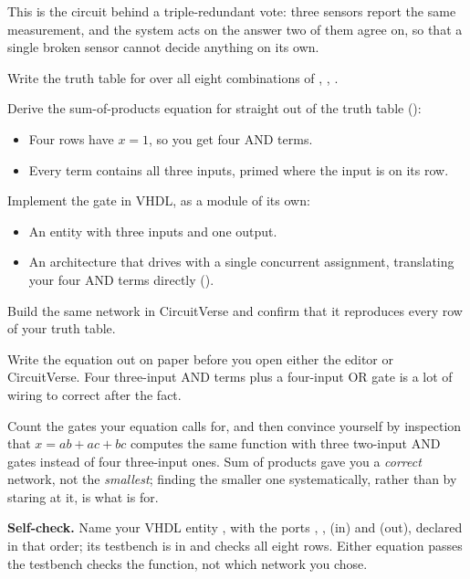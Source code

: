 This is the circuit behind a triple-redundant vote: three sensors report the same measurement, and
the system acts on the answer two of them agree on, so that a single broken sensor cannot decide
anything on its own.

 Write the truth table for  over all eight combinations of , ,
.

 Derive the sum-of-products equation for  straight out of the truth table
():
\begin{itemize}
  \item Four rows have $x = 1$, so you get four AND terms.
  \item Every term contains all three inputs, primed where the input is  on its row.
\end{itemize}

 Implement the gate in VHDL, as a module of its own:
\begin{itemize}
  \item An entity with three  inputs and one  output.
  \item An architecture that drives  with a single concurrent assignment, translating your
    four AND terms directly ().
\end{itemize}

 Build the same network in CircuitVerse and confirm that it reproduces every row of your
truth table.

\note[Hint]Write the equation out on paper before you open either the editor or CircuitVerse. Four
three-input AND terms plus a four-input OR gate is a lot of wiring to correct after the fact.

Count the gates your equation calls for, and then convince yourself by
inspection that $x = ab + ac + bc$ computes the same function with three two-input AND gates
instead of four three-input ones. Sum of products gave you a \emph{correct} network, not the
\emph{smallest}; finding the smaller one systematically, rather than by staring at it, is what
 is for.


\begin{selfcheck}
\textbf{Self-check.} Name your VHDL entity , with the ports , ,
 (in) and  (out), declared in that order; its testbench is in
 and checks all eight rows. Either equation passes \textemdash{} the
testbench checks the function, not which network you chose.
\end{selfcheck}

